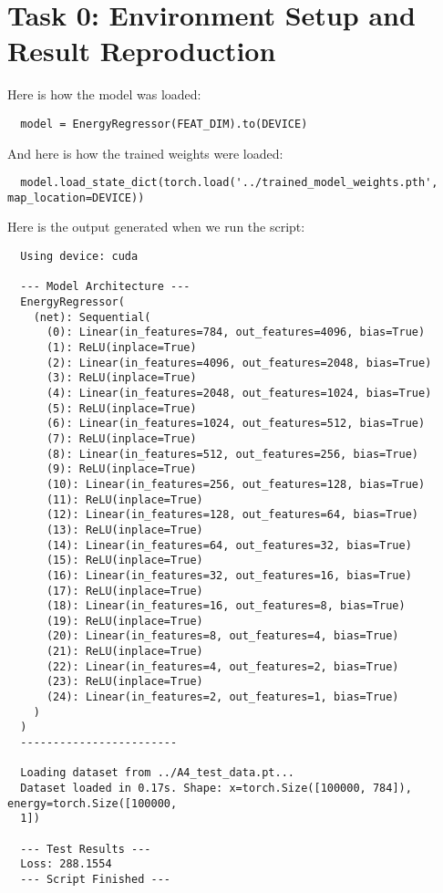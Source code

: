 \documentclass[a4paper,12pt]{article}
\title{\cooltitle{CS726 Programming Assignment -- 4 Report}}
\author{
\textbf{Saksham Rathi (22B1003)}\\
\textbf{Sharvanee Sonawane (22B0943)}\\
\textbf{Deeksha Dhiwakar (22B0988)}\\
\small Department of Computer Science, \\
Indian Institute of Technology Bombay \\}
\date{}
\begin{document}
\maketitle

\section*{Task 0: Environment Setup and Result Reproduction}
Here is how the model was loaded:
\begin{verbatim}
  model = EnergyRegressor(FEAT_DIM).to(DEVICE)
\end{verbatim}

And here is how the trained weights were loaded:
\begin{verbatim}
  model.load_state_dict(torch.load('../trained_model_weights.pth', map_location=DEVICE))
\end{verbatim}

Here is the output generated when we run the script:
\begin{verbatim}
  Using device: cuda

  --- Model Architecture ---
  EnergyRegressor(
    (net): Sequential(
      (0): Linear(in_features=784, out_features=4096, bias=True)
      (1): ReLU(inplace=True)
      (2): Linear(in_features=4096, out_features=2048, bias=True)
      (3): ReLU(inplace=True)
      (4): Linear(in_features=2048, out_features=1024, bias=True)
      (5): ReLU(inplace=True)
      (6): Linear(in_features=1024, out_features=512, bias=True)
      (7): ReLU(inplace=True)
      (8): Linear(in_features=512, out_features=256, bias=True)
      (9): ReLU(inplace=True)
      (10): Linear(in_features=256, out_features=128, bias=True)
      (11): ReLU(inplace=True)
      (12): Linear(in_features=128, out_features=64, bias=True)
      (13): ReLU(inplace=True)
      (14): Linear(in_features=64, out_features=32, bias=True)
      (15): ReLU(inplace=True)
      (16): Linear(in_features=32, out_features=16, bias=True)
      (17): ReLU(inplace=True)
      (18): Linear(in_features=16, out_features=8, bias=True)
      (19): ReLU(inplace=True)
      (20): Linear(in_features=8, out_features=4, bias=True)
      (21): ReLU(inplace=True)
      (22): Linear(in_features=4, out_features=2, bias=True)
      (23): ReLU(inplace=True)
      (24): Linear(in_features=2, out_features=1, bias=True)
    )
  )
  ------------------------
  
  Loading dataset from ../A4_test_data.pt...
  Dataset loaded in 0.17s. Shape: x=torch.Size([100000, 784]), energy=torch.Size([100000, 
  1])
  
  --- Test Results ---
  Loss: 288.1554
  --- Script Finished ---  
\end{verbatim}
\end{document}
